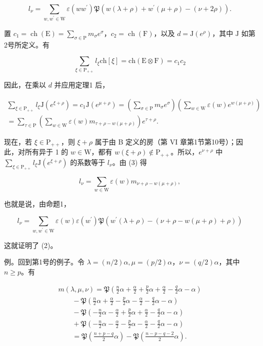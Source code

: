 \[
l _ {\nu} = \sum_ {w, w ^ {\prime} \in \mathrm{W}} \varepsilon (w w ^ {\prime}) \mathfrak {P} (w (\lambda + \rho) + w ^ {\prime} (\mu + \rho) - (\nu + 2 \rho)).\tag{2}
\]

置 \(c_{1} = \operatorname{ch}(\mathrm{E}) = \sum_{\sigma \in \mathrm{P}} m_{\sigma} e^{\sigma}\)，\(c_{2} = \operatorname{ch}(\mathrm{F})\)，以及 \(d = \mathrm{J}(e^{\rho})\)，其中 \(\mathrm{J}\) 如第2号所定义。有

\[
\sum_ {\xi \in \mathrm{P} _ {+ +}} l _ {\xi} \mathrm{ch} [ \xi ] = \mathrm{ch} (\mathrm{E} \otimes \mathrm{F}) = c _ {1} c _ {2}
\]

因此，在乘以 \(d\) 并应用定理1 后，

\[
\begin{array}{c} \sum_ {\xi \in \mathrm{P} _ {+ +}} l _ {\xi} \mathrm{J} (e ^ {\xi + \rho}) = c _ {1} \mathrm{J} (e ^ {\mu + \rho}) = \left(\sum_ {\sigma \in \mathrm{P}} m _ {\sigma} e ^ {\sigma}\right) \left(\sum_ {w \in \mathrm{W}} \varepsilon (w) e ^ {w (\mu + \rho)}\right) \\ = \sum_ {\tau \in \mathrm{P}} \left(\sum_ {w \in \mathrm{W}} \varepsilon (w) m _ {\tau + \rho - w (\mu + \rho)}\right) e ^ {\tau + \rho}. \end{array}\tag{3}
\]

现在，若 \(\xi \in \mathrm{P}_{++}\)，则 \(\xi + \rho\) 属于由 B 定义的房（第 VI 章第1节第10号）；因此，对所有异于 1 的 \(w \in \mathrm{W}\)，都有 \(w(\xi + \rho) \notin \mathrm{P}_{++}\)。所以，\(e^{\nu + \rho}\) 中 \(\sum_{\xi \in \mathrm{P}_{++}} l_{\xi} \mathrm{J}(e^{\xi + \rho})\) 的系数等于 \(l_{\nu}\)。由 (3) 得

\[
l _ {\nu} = \sum_ {w \in \mathrm{W}} \varepsilon (w) m _ {\nu + \rho - w (\mu + \rho)},
\]

也就是说，由命题1，

\[
l _ {\nu} = \sum_ {w, w ^ {\prime} \in \mathrm{W}} \varepsilon (w) \varepsilon (w ^ {\prime}) \mathfrak {P} (w ^ {\prime} (\lambda + \rho) - (\nu + \rho - w (\mu + \rho) + \rho))
\]

这就证明了 (2)。

例。回到第1号的例子。令 \(\lambda = (n/2)\alpha, \mu = (p/2)\alpha\)，\(\nu = (q/2)\alpha\)，其中 \(n \geq p\)。有

\[
\begin{array}{l} m (\lambda , \mu , \nu) = \mathfrak {P} \left(\frac {n}{2} \alpha + \frac {\alpha}{2} + \frac {p}{2} \alpha + \frac {\alpha}{2} - \frac {q}{2} \alpha - \alpha\right) \\ \qquad - \mathfrak {P} \left(\frac {n}{2} \alpha + \frac {\alpha}{2} - \frac {p}{2} \alpha - \frac {\alpha}{2} - \frac {q}{2} \alpha - \alpha\right) \\ \qquad - \mathfrak {P} \left(- \frac {n}{2} \alpha - \frac {\alpha}{2} + \frac {p}{2} \alpha + \frac {\alpha}{2} - \frac {q}{2} \alpha - \alpha\right) \\ \qquad + \mathfrak {P} \left(- \frac {n}{2} \alpha - \frac {\alpha}{2} - \frac {p}{2} \alpha - \frac {\alpha}{2} - \frac {q}{2} \alpha - \alpha\right) \\ \qquad = \mathfrak {P} \left(\frac {n + p - q}{2} \alpha\right) - \mathfrak {P} \left(\frac {n - p - q - 2}{2} \alpha\right). \end{array}
\]

